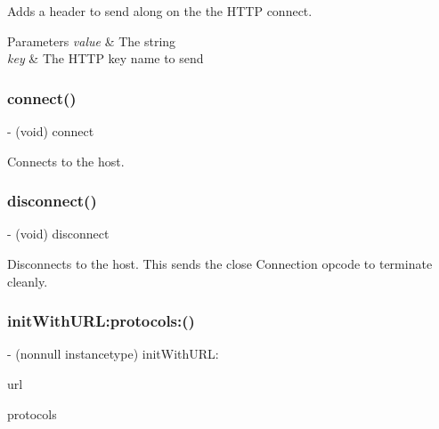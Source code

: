 Adds a header to send along on the the H\+T\+TP connect. 
\begin{DoxyParams}{Parameters}
{\em value} & The string \\
\hline
{\em key} & The H\+T\+TP key name to send \\
\hline
\end{DoxyParams}
\hypertarget{interface_s_t_c_web_socket_a19172c26477af8b2f31e00d6ad65786c}{}\label{interface_s_t_c_web_socket_a19172c26477af8b2f31e00d6ad65786c} 
\subsubsection{\texorpdfstring{connect()}{connect()}}
{\footnotesize\ttfamily -\/ (void) connect \begin{DoxyParamCaption}{ }\end{DoxyParamCaption}}

Connects to the host. \hypertarget{interface_s_t_c_web_socket_a6001ae9ed7f1758b92bf8d85bbd42fe5}{}\label{interface_s_t_c_web_socket_a6001ae9ed7f1758b92bf8d85bbd42fe5} 
\subsubsection{\texorpdfstring{disconnect()}{disconnect()}}
{\footnotesize\ttfamily -\/ (void) disconnect \begin{DoxyParamCaption}{ }\end{DoxyParamCaption}}

Disconnects to the host. This sends the close Connection opcode to terminate cleanly. \hypertarget{interface_s_t_c_web_socket_a748e5be92eae2e05f70f26756b8d7e64}{}\label{interface_s_t_c_web_socket_a748e5be92eae2e05f70f26756b8d7e64} 
\subsubsection{\texorpdfstring{init\+With\+U\+R\+L\+:protocols\+:()}{initWithURL:protocols:()}}
{\footnotesize\ttfamily -\/ (nonnull instancetype) init\+With\+U\+R\+L\+: \begin{DoxyParamCaption}\item[{(nonnull N\+S\+U\+RL $\ast$)}]{url }\item[{protocols:(nullable N\+S\+Array $\ast$)}]{protocols }\end{DoxyParamCaption}}

